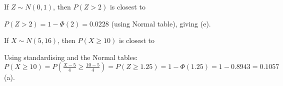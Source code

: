 \documentclass[bigtut]{tutorial}
\begin{document}
\begin{tutorial}
\begin{questions}
\question
If $Z \sim N(0,1)$, then $P(Z > 2)$ is closest to
\begin{solution}
$P(Z > 2) = 1-\Phi(2) = 0.0228$ (using Normal table), giving (e).
\end{solution}

\question
If $X \sim N(5,16)$, then $P(X \geq 10)$ is closest to
\begin{solution}
Using standardising and the Normal tables: \\
$P(X \geq 10) = P( \frac{X-5}{4} \geq  \frac{10-5}{4}) = P(Z \geq 1.25) = 1- \Phi(1.25) = 1-0.8943 = 0.1057$ (a).
\end{solution}




\end{questions}
\end{tutorial}
\end{document}
